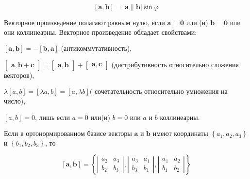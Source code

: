 \documentclass[10pt]{article}
\begin{document}
\[

[\boldsymbol{a}, \boldsymbol{b}]=|\boldsymbol{a} \| \boldsymbol{b}| \sin \varphi

\]



Векторное произведение полагают равным нулю, если $\boldsymbol{a}=\mathbf{0}$ или (и) $\boldsymbol{b}=\mathbf{0}$ или они коллинеарны. Векторное произведение обладает свойствами:



$[\boldsymbol{a}, \boldsymbol{b}]=-[\boldsymbol{b}, \boldsymbol{a}]$ (антикоммутативность),



$\left[\begin{array}{ll}\boldsymbol{a}, \boldsymbol{b}+\boldsymbol{c}\end{array}\right]=\left[\begin{array}{ll}\boldsymbol{a}, \boldsymbol{b}\end{array}\right]+\left[\begin{array}{ll}\boldsymbol{a}, \boldsymbol{c}\end{array}\right]$ (дистрибутивность относительно сложения векторов),



$\lambda[a, b]=[\lambda a, b]=[a, \lambda b]($ сочетательность относительно умножения на число),



$[a, b]=0$, лишь если $a=0$ или(и) $b=0$ или $a$ и $b$ коллинеарны.



Если в ортонормированном базисе векторы $\boldsymbol{a}$ и $\boldsymbol{b}$ имеют координаты $\left\{a_{1}, a_{2}, a_{3}\right\}$ и $\left\{b_{1}, b_{2}, b_{3}\right\}$, то



\[

[\boldsymbol{a}, \boldsymbol{b}]=\left\{\left|\begin{array}{ll}

a_{2} & a_{3} \\

b_{2} & b_{3}

\end{array}\right|,\left|\begin{array}{ll}

a_{3} & a_{1} \\

b_{3} & b_{1}

\end{array}\right|,\left|\begin{array}{ll}

a_{1} & a_{2} \\

b_{1} & b_{2}

\end{array}\right|\right\}

\]
\end{document}
